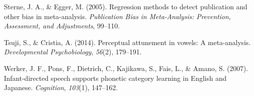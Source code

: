 \documentclass[english,floatsintext,man]{apa6}
\begin{document}
\hypertarget{ref-sterne2005regression}{}
Sterne, J. A., \& Egger, M. (2005). Regression methods to detect
publication and other bias in meta-analysis. \emph{Publication Bias in
Meta-Analysis: Prevention, Assessment, and Adjustments}, 99--110.

\hypertarget{ref-tsuji2014perceptual}{}
Tsuji, S., \& Cristia, A. (2014). Perceptual attunement in vowels: A
meta-analysis. \emph{Developmental Psychobiology}, \emph{56}(2),
179--191.

\hypertarget{ref-werker2007infant}{}
Werker, J. F., Pons, F., Dietrich, C., Kajikawa, S., Fais, L., \& Amano,
S. (2007). Infant-directed speech supports phonetic category learning in
English and Japanese. \emph{Cognition}, \emph{103}(1), 147--162.
\end{document}
